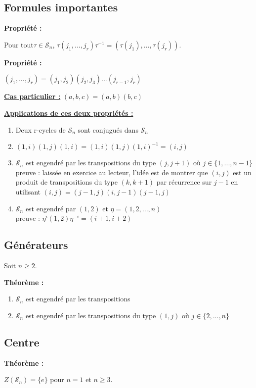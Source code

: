 \documentclass{report}
\newenvironment{prop}{\begin{tcolorbox}[colframe= white]
    \textbf{Propriété :}
     \par}
    {\end{tcolorbox}}
\newenvironment{theoreme}[1][]{
    \begin{tcolorbox}[]
    \textbf{Théorème :} #1  \par} 
    {\end{tcolorbox}}
\newcommand{\sn}{\mathcal{S}_{n}}
\begin{document}
\subsection{Formules importantes}
\begin{prop}
Pour tout$\tau\in\sn$, $\tau(j_1,...,j_r)\tau^{-1}=(\tau(j_1),...,\tau(j_r))$.
\end{prop}
\begin{prop}
$(j_1,...,j_r)=(j_1,j_2)(j_2,j_3)...(j_{r-1},j_r)$
\end{prop}

\noindent\underline{\textbf{Cas particulier :}} $(a,b,c)=(a,b)(b,c)$

\noindent\underline{\textbf{Applications de ces deux propriétés :}}
\begin{enumerate}
\item Deux r-cycles de $\sn$ sont conjugués dans $\sn$
\item $(1, i)(1,j)(1,i)=(1,i)(1,j)(1,i)^{-1}=(i,j)$
\item $\sn$ est engendré par les transpositions du type $(j, j+1)$ où $j\in\{1,...,n-1\}$\\
preuve : laissée en exercice au lecteur, l'idée est de montrer que $(i,j)$ est un produit de transpositions du type $(k,k+1)$ par récurrence sur $j-1$ en utilisant $(i,j)=(j-1,j)(i,j-1)(j-1,j)$
\item $\sn$ est engendré par $(1,2)$ et $\eta=(1,2,...,n)$\\
preuve : $\eta^i(1,2)\eta^{-i}=(i+1,i+2)$
\end{enumerate}

\subsection{Générateurs}
Soit $n \geq 2$.

\begin{theoreme}
\begin{enumerate}
\item $\sn$ est engendré par les transpositions
\item $\sn$ est engendré par les transpositions du type $(1,j)$ où $j\in\{2,...,n\}$
\end{enumerate}
\end{theoreme}

\subsection{Centre}
\begin{theoreme}
$Z(\sn)=\{e\}$ pour $n=1$ et $n\geq3$.
\end{theoreme}
\end{document}
